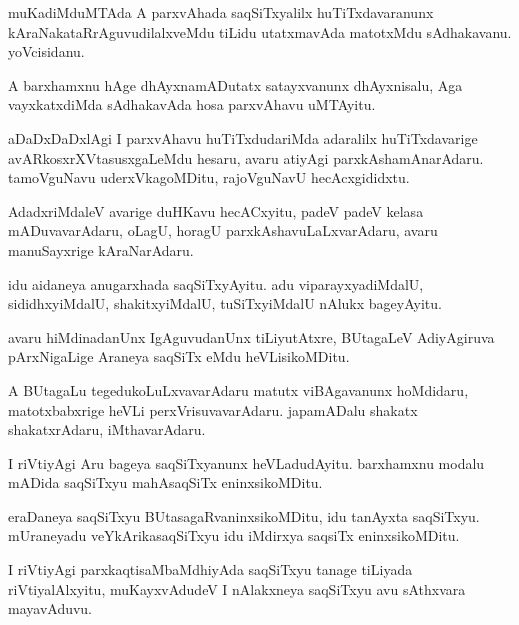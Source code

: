 \documentclass{article}
\begin{document}
\begin{mn}
muKadiMduMTAda A parxvAhada saqSiTxyalilx huTiTxdavaranunx
kAraNakataRrAguvudilalxveMdu tiLidu utatxmavAda matotxMdu
sAdhakavanu. yoVcisidanu.
\end{mn}

\begin{mn}
A barxhamxnu hAge dhAyxnamADutatx satayxvanunx dhAyxnisalu, Aga
vayxkatxdiMda sAdhakavAda hosa parxvAhavu uMTAyitu.
\end{mn}

\begin{mn}%
aDaDxDaDxlAgi I parxvAhavu huTiTxdudariMda adaralilx huTiTxdavarige
avARkosxrXVtasusxgaLeMdu hesaru, avaru atiyAgi
parxkAshamAnarAdaru. tamoVguNavu uderxVkagoMDitu, rajoVguNavU hecAcxgididxtu.
\end{mn}

\begin{mn}
AdadxriMdaleV avarige duHKavu hecACxyitu, padeV padeV kelasa
mADuvavarAdaru, oLagU, horagU parxkAshavuLaLxvarAdaru, avaru
manuSayxrige kAraNarAdaru.
\end{mn}

\begin{mn}
idu aidaneya anugarxhada saqSiTxyAyitu. adu viparayxyadiMdalU,
sididhxyiMdalU, shakitxyiMdalU, tuSiTxyiMdalU nAlukx bageyAyitu.
\end{mn}

\begin{mn}
avaru hiMdinadanUnx IgAguvudanUnx tiLiyutAtxre, BUtagaLeV AdiyAgiruva
pArxNigaLige Araneya saqSiTx eMdu heVLisikoMDitu.
\end{mn}

\begin{mn}
A BUtagaLu tegedukoLuLxvavarAdaru matutx viBAgavanunx hoMdidaru,
matotxbabxrige heVLi perxVrisuvavarAdaru. japamADalu shakatx
shakatxrAdaru, iMthavarAdaru.
\end{mn}

\begin{mn}%
I riVtiyAgi Aru bageya saqSiTxyanunx heVLadudAyitu. barxhamxnu modalu
mADida saqSiTxyu mahAsaqSiTx eninxsikoMDitu.
\end{mn}

\begin{mn}
eraDaneya saqSiTxyu BUtasagaRvaninxsikoMDitu, idu tanAyxta
saqSiTxyu. mUraneyadu veYkArikasaqSiTxyu idu iMdirxya saqsiTx eninxsikoMDitu.
\end{mn}

\begin{mn}
I riVtiyAgi parxkaqtisaMbaMdhiyAda saqSiTxyu tanage tiLiyada
riVtiyalAlxyitu, muKayxvAdudeV I nAlakxneya saqSiTxyu avu sAthxvara mayavAduvu.
\end{mn}
\end{document}
